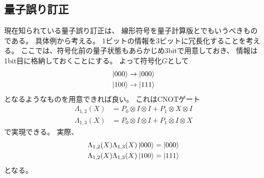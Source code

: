 \documentclass[]{ltjsarticle}
\begin{document}
\subsection{量子誤り訂正}
現在知られている量子誤り訂正は、
線形符号を量子計算版とでもいうべきものである。
具体例から考える。
1ビットの情報を3ビットに冗長化することを考える。
ここでは、符号化前の量子状態もあらかじめ3bitで用意しておき、
情報は1bit目に格納しておくことにする。
よって符号化$G$として
\begin{align}
    \ket{000} &\to \ket{000} \\
    \ket{100} &\to \ket{111}
\end{align}
となるようなものを用意できれば良い。
これはCNOTゲート
\begin{align}
    \Lambda_{1,2}(X) 
    &=
    P_0 \otimes I \otimes I
    +
    P_1 \otimes X \otimes I \\
    \Lambda_{1,3}(X) 
    &=
    P_0 \otimes I \otimes I
    +
    P_1 \otimes I \otimes X
\end{align}
で実現できる。
実際、
\begin{align}
    \Lambda_{1,2}(X)\Lambda_{1,3}(X)\ket{000}
    &=
    \ket{000} \\
    \Lambda_{1,2}(X)\Lambda_{1,3}(X)\ket{100}
    &=
    \ket{111}
\end{align}
となる。
\end{document}
